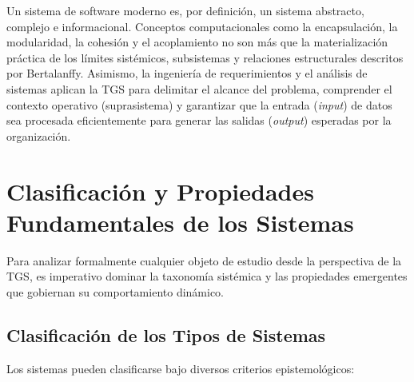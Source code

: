 \documentclass[12pt,letterpaper]{article}
\begin{document}
Un sistema de software moderno es, por definición, un sistema abstracto, complejo e informacional. Conceptos computacionales como la encapsulación, la modularidad, la cohesión y el acoplamiento no son más que la materialización práctica de los límites sistémicos, subsistemas y relaciones estructurales descritos por Bertalanffy. Asimismo, la ingeniería de requerimientos y el análisis de sistemas aplican la TGS para delimitar el alcance del problema, comprender el contexto operativo (suprasistema) y garantizar que la entrada (\textit{input}) de datos sea procesada eficientemente para generar las salidas (\textit{output}) esperadas por la organización.

\section*{Clasificación y Propiedades Fundamentales de los Sistemas}

Para analizar formalmente cualquier objeto de estudio desde la perspectiva de la TGS, es imperativo dominar la taxonomía sistémica y las propiedades emergentes que gobiernan su comportamiento dinámico.
\newpage
\subsection*{Clasificación de los Tipos de Sistemas}

Los sistemas pueden clasificarse bajo diversos criterios epistemológicos:
\end{document}
